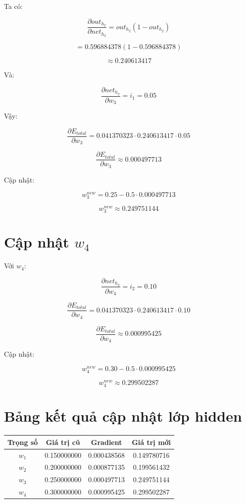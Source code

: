\documentclass[12pt,a4paper]{report}
\begin{document}
Ta có:

\[
    \frac{\partial out_{h_2}}{\partial net_{h_2}}
    =
    out_{h_2}(1-out_{h_2})
\]

\[
    =
    0.596884378(1-0.596884378)
\]

\[
    \approx 0.240613417
\]

Và:

\[
    \frac{\partial net_{h_2}}{\partial w_3}=i_1=0.05
\]

Vậy:

\[
    \frac{\partial E_{total}}{\partial w_3}
    =
    0.041370323
    \cdot
    0.240613417
    \cdot
    0.05
\]

\[
    \frac{\partial E_{total}}{\partial w_3}
    \approx 0.000497713
\]

Cập nhật:

\[
    w_3^{new}
    =
    0.25
    -
    0.5\cdot 0.000497713
\]

\[
    w_3^{new}
    \approx 0.249751144
\]

\section{Cập nhật $w_4$}

Với $w_4$:

\[
    \frac{\partial net_{h_2}}{\partial w_4}=i_2=0.10
\]

\[
    \frac{\partial E_{total}}{\partial w_4}
    =
    0.041370323
    \cdot
    0.240613417
    \cdot
    0.10
\]

\[
    \frac{\partial E_{total}}{\partial w_4}
    \approx 0.000995425
\]

Cập nhật:

\[
    w_4^{new}
    =
    0.30
    -
    0.5\cdot 0.000995425
\]

\[
    w_4^{new}
    \approx 0.299502287
\]

\section{Bảng kết quả cập nhật lớp hidden}

\begin{center}
\begin{tabular}{cccc}
\toprule
Trọng số & Giá trị cũ & Gradient & Giá trị mới \\
\midrule
$w_1$ & 0.150000000 & 0.000438568 & 0.149780716 \\
$w_2$ & 0.200000000 & 0.000877135 & 0.199561432 \\
$w_3$ & 0.250000000 & 0.000497713 & 0.249751144 \\
$w_4$ & 0.300000000 & 0.000995425 & 0.299502287 \\
\bottomrule
\end{tabular}
\end{center}
\end{document}
